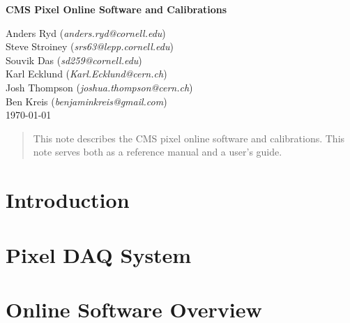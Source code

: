 \documentclass[12pt]{article}
\begin{document}

\begin{center}
{\Large{\bf CMS Pixel Online Software and Calibrations}}
\end{center}
\begin{center}
\vskip 0.5cm
Anders Ryd ({\it anders.ryd@cornell.edu})\\
Steve Stroiney ({\it srs63@lepp.cornell.edu})\\
Souvik Das ({\it sd259@cornell.edu}) \\
Karl Ecklund ({\it Karl.Ecklund@cern.ch})\\
Josh Thompson ({\it joshua.thompson@cern.ch}) \\
Ben Kreis ({\it benjaminkreis@gmail.com})\\
\today \\
\end{center}


\begin{abstract}
This note describes the CMS pixel online software and
calibrations. This note serves both as a reference manual
and a user's guide. 

\end{abstract}

\newpage

\tableofcontents

\newpage

\section{Introduction}


\section{Pixel DAQ System}
\label{sec:PixelDAQSystem}


\section{Online Software Overview}
\label{sect:overview}

\end{document}
